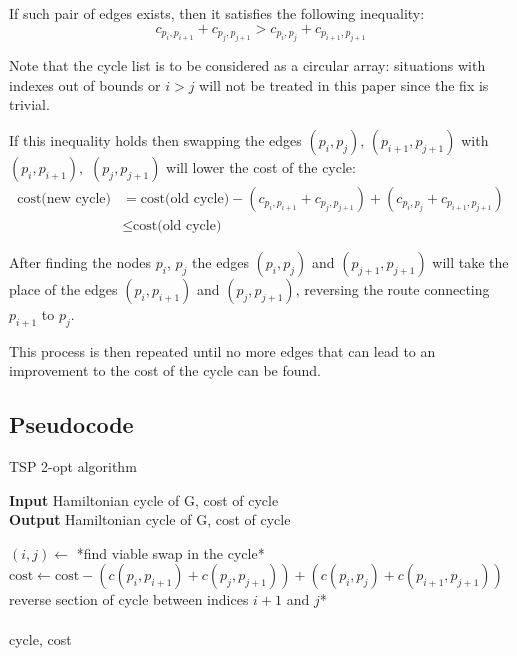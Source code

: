 If such pair of edges exists, then it satisfies the following inequality:
$$c_{p_i,p_{i+1}}+c_{p_j,p_{j+1}} > c_{p_i,p_{j}}+c_{p_{i+1},p_{j+1}}$$

Note that the cycle list is to be considered as a circular array: situations with indexes out of bounds or $i>j$ will not be treated in this paper since the fix is trivial.

If this inequality holds then swapping the edges $(p_i,p_j),\,(p_{i+1},p_{j+1})$ with $(p_i,p_{i+1}),$ $(p_{j},p_{j+1})$ will lower the cost of the cycle:
\begin{align*}
    \mbox{cost(new cycle)}&=\mbox{cost(old cycle)}-(c_{p_i,p_{i+1}}+c_{p_j,p_{j+1}})+(c_{p_i,p_{j}}+c_{p_{i+1},p_{j+1}})\\
    &\leq\mbox{cost(old cycle)}
\end{align*}

After finding the nodes $p_i$, $p_j$ the edges $(p_i, p_j)$ and $(p_{j+1}, p_{j+1})$ will take the place of the edges $(p_i, p_{i+1})$ and $(p_j, p_{j+1})$, reversing the route connecting $p_{i+1}$ to $p_{j}$.

This process is then repeated until no more edges that can lead to an improvement to the cost of the cycle can be found.

\newpage

\subsection{Pseudocode}
\begin{algorithm}
    \caption{TSP 2-opt algorithm}

    \textbf{Input} Hamiltonian cycle of G, cost of cycle\\
    \textbf{Output} Hamiltonian cycle of G, cost of cycle\\
    \begin{algorithmic}

            \State $(i, j)\gets$ *find viable swap in the cycle*
            \State $\mbox{cost}\gets\mbox{cost}-(c(p_i,p_{i+1})+c(p_j,p_{j+1}))+(c(p_i,p_{j})+c(p_{i+1},p_{j+1}))$
            \State *reverse section of cycle between indices $i+1$ and $j$*
        \EndWhile\\\\

        \Return cycle, cost

    \end{algorithmic}
\end{algorithm}

